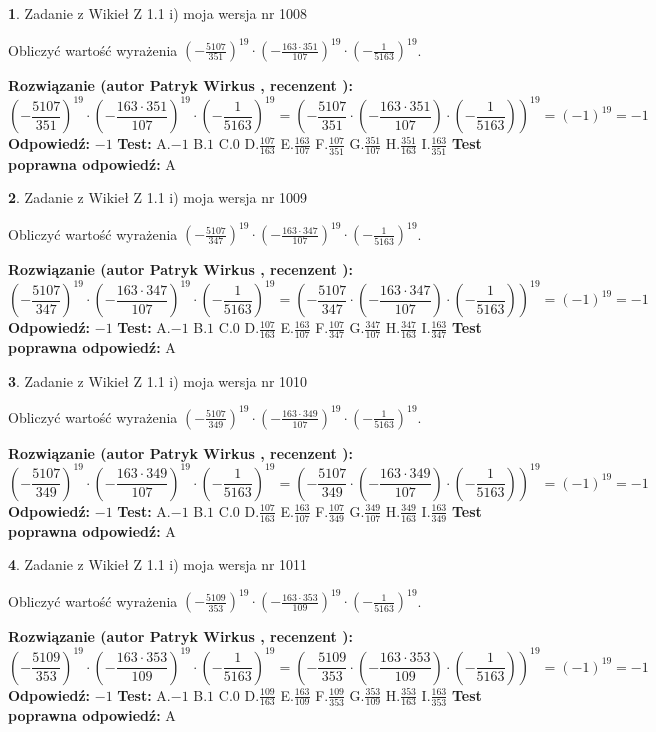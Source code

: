 \documentclass[12pt, a4paper]{article}
\theoremstyle{definition} %
\newtheorem{zad}{}
\newcommand{\zadStart}[1]{\begin{zad}#1\newline}
\newcommand{\zadStop}{\end{zad}}
\newcommand{\rozwStart}[2]{\noindent \textbf{Rozwiązanie (autor #1 , recenzent #2): }\newline}
\newcommand{\rozwStop}{\newline}
\newcommand{\odpStart}{\noindent \textbf{Odpowiedź:}\newline}
\newcommand{\odpStop}{\newline}
\newcommand{\testStart}{\noindent \textbf{Test:}\newline}
\newcommand{\testStop}{\newline}
\newcommand{\kluczStart}{\noindent \textbf{Test poprawna odpowiedź:}\newline}
\newcommand{\kluczStop}{\newline}
\begin{document}
\zadStart{Zadanie z Wikieł Z 1.1 i) moja wersja nr 1008}

Obliczyć wartość wyrażenia $(-\frac{5107}{351})^{19} \cdot (-\frac{163 \cdot 351}{107})^{19} \cdot (-\frac{1}{5163})^{19}$.
\zadStop
\rozwStart{Patryk Wirkus}{}
$$(-\frac{5107}{351})^{19} \cdot (-\frac{163 \cdot 351}{107})^{19} \cdot (-\frac{1}{5163})^{19} = (-\frac{5107}{351} \cdot (-\frac{163 \cdot 351}{107}) \cdot (-\frac{1}{5163}))^{19} = (-1)^{19} = -1$$
\rozwStop
\odpStart
$-1$
\odpStop
\testStart
A.$-1$ B.$1$ C.$0$ D.$\frac{107}{163}$ E.$\frac{163}{107}$
F.$\frac{107}{351}$ G.$\frac{351}{107}$
H.$\frac{351}{163}$
I.$\frac{163}{351}$
\testStop
\kluczStart
A
\kluczStop



\zadStart{Zadanie z Wikieł Z 1.1 i) moja wersja nr 1009}

Obliczyć wartość wyrażenia $(-\frac{5107}{347})^{19} \cdot (-\frac{163 \cdot 347}{107})^{19} \cdot (-\frac{1}{5163})^{19}$.
\zadStop
\rozwStart{Patryk Wirkus}{}
$$(-\frac{5107}{347})^{19} \cdot (-\frac{163 \cdot 347}{107})^{19} \cdot (-\frac{1}{5163})^{19} = (-\frac{5107}{347} \cdot (-\frac{163 \cdot 347}{107}) \cdot (-\frac{1}{5163}))^{19} = (-1)^{19} = -1$$
\rozwStop
\odpStart
$-1$
\odpStop
\testStart
A.$-1$ B.$1$ C.$0$ D.$\frac{107}{163}$ E.$\frac{163}{107}$
F.$\frac{107}{347}$ G.$\frac{347}{107}$
H.$\frac{347}{163}$
I.$\frac{163}{347}$
\testStop
\kluczStart
A
\kluczStop



\zadStart{Zadanie z Wikieł Z 1.1 i) moja wersja nr 1010}

Obliczyć wartość wyrażenia $(-\frac{5107}{349})^{19} \cdot (-\frac{163 \cdot 349}{107})^{19} \cdot (-\frac{1}{5163})^{19}$.
\zadStop
\rozwStart{Patryk Wirkus}{}
$$(-\frac{5107}{349})^{19} \cdot (-\frac{163 \cdot 349}{107})^{19} \cdot (-\frac{1}{5163})^{19} = (-\frac{5107}{349} \cdot (-\frac{163 \cdot 349}{107}) \cdot (-\frac{1}{5163}))^{19} = (-1)^{19} = -1$$
\rozwStop
\odpStart
$-1$
\odpStop
\testStart
A.$-1$ B.$1$ C.$0$ D.$\frac{107}{163}$ E.$\frac{163}{107}$
F.$\frac{107}{349}$ G.$\frac{349}{107}$
H.$\frac{349}{163}$
I.$\frac{163}{349}$
\testStop
\kluczStart
A
\kluczStop



\zadStart{Zadanie z Wikieł Z 1.1 i) moja wersja nr 1011}

Obliczyć wartość wyrażenia $(-\frac{5109}{353})^{19} \cdot (-\frac{163 \cdot 353}{109})^{19} \cdot (-\frac{1}{5163})^{19}$.
\zadStop
\rozwStart{Patryk Wirkus}{}
$$(-\frac{5109}{353})^{19} \cdot (-\frac{163 \cdot 353}{109})^{19} \cdot (-\frac{1}{5163})^{19} = (-\frac{5109}{353} \cdot (-\frac{163 \cdot 353}{109}) \cdot (-\frac{1}{5163}))^{19} = (-1)^{19} = -1$$
\rozwStop
\odpStart
$-1$
\odpStop
\testStart
A.$-1$ B.$1$ C.$0$ D.$\frac{109}{163}$ E.$\frac{163}{109}$
F.$\frac{109}{353}$ G.$\frac{353}{109}$
H.$\frac{353}{163}$
I.$\frac{163}{353}$
\testStop
\kluczStart
A
\kluczStop
\end{document}

